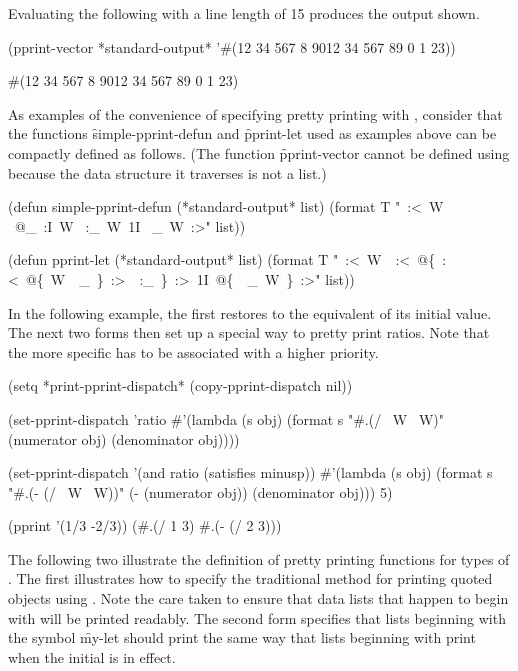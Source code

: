 Evaluating the following with a line length of 15 produces the output shown.
 
\code
 (pprint-vector *standard-output* '#(12 34 567 8 9012 34 567 89 0 1 23))
 
 #(12 34 567 8 
   9012 34 567 
   89 0 1 23)
\endcode

As examples of the convenience of specifying pretty printing with 
, consider that the functions \f{simple-pprint-defun}
and \f{pprint-let} used as examples above can be compactly defined as follows.
(The function \f{pprint-vector} cannot be defined using 
because the data structure it traverses is not a list.)
 
\code
(defun simple-pprint-defun (*standard-output* list)
  (format T "~:<~W ~@_~:I~W ~:_~W~1I ~_~W~:>" list))

(defun pprint-let (*standard-output* list)
  (format T "~:<~W~{\hat}~:<~@\{~:<~@\{~W~{\hat}~_~\}~:>~{\hat}~:_~\}~:>~1I~@\{~{\hat}~_~W~\}~:>" list)) 
\endcode

In the following example, the first  restores
 to the equivalent of its initial value.
The next two forms then set up a special way to pretty print ratios.
Note that the more specific  has to be associated
with a higher priority.
 
\code
 (setq *print-pprint-dispatch* (copy-pprint-dispatch nil))

 (set-pprint-dispatch 'ratio
   #'(lambda (s obj)
       (format s "#.(/ ~W ~W)" 
                 (numerator obj) (denominator obj))))

 (set-pprint-dispatch '(and ratio (satisfies minusp))
   #'(lambda (s obj)
       (format s "#.(- (/ ~W ~W))" 
               (- (numerator obj)) (denominator obj)))
   5)

 (pprint '(1/3 -2/3))
 (#.(/ 1 3) \#.(- (/ 2 3)))
\endcode

The following two  illustrate the definition of 
pretty printing functions for types of .  The first
 illustrates how to specify the traditional method 
for printing quoted objects using .  Note
the care taken to ensure that data lists that happen to begin
with  will be printed readably.  The second form 
specifies that lists beginning with the symbol \f{my-let}
should print the same way that lists beginning with 
print when the initial  is in effect.
 

